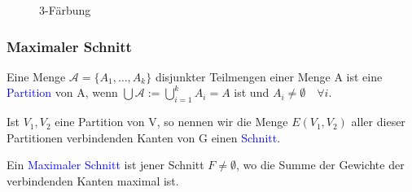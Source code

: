 \begin{figure}[h]
\begin{center}
\caption[3-Färbung]{3-Färbung}
  \label{Faerbung}
\end{center}
\end{figure}


\subsubsection*{Maximaler Schnitt}

\begin{definition}
Eine Menge $\mathcal{A} = \{A_1,\ldots,A_k\}$ disjunkter Teilmengen einer Menge A ist eine \textcolor{blue}{Partition} von A, wenn $\bigcup \mathcal{A} := \bigcup_{i=1}^k A_i = A$ ist und $A_i \neq \emptyset \quad \forall i$. \cite{Diestel}  
\end{definition}

\begin{definition}
Ist ${V_1,V_2}$ eine Partition von V, so nennen wir die Menge $E(V_1,V_2)$ aller dieser Partitionen verbindenden Kanten von G einen \textcolor{blue}{Schnitt}.  \cite{Diestel} 
\end{definition}

\begin{definition}
Ein \textcolor{blue}{Maximaler Schnitt} ist jener Schnitt $F \neq \emptyset$, wo die Summe der Gewichte der verbindenden Kanten maximal ist. 
\end{definition}


